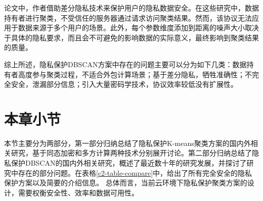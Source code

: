 论文\cite{2018DP,2015A}中，作者借助差分隐私技术来保护用户的隐私数据安全。在这些研究中，数据持有者进行聚类，不受信任的服务器通过请求访问聚类结果。然而，该协议无法应用于数据来源于多个用户的场景。此外，每个参数维度添加到距离的噪声大小取决于具体的隐私要求，而且会不可避免的影响数据的实际意义，最终影响到聚类结果的质量。

综上所述，隐私保护DBSCAN方案中存在的问题主要可以分为如下几类：数据持有者高度参与聚类过程，不适合外包计算场景；基于差分隐私，牺牲准确性；不完全安全，泄漏部分信息；引入大量密码学技术，协议效率较低没有扩展性。

\section{本章小节}
本节主要分为两部分，第一部分归纳总结了隐私保护K-means聚类方案的国内外相关研究，基于同态加密和多方计算两种技术分别展开讨论。第二部分归纳总结了隐私保护DBSCAN的国内外相关研究，概述了最近数十年的研究发展，并探讨了研究中存在的部分问题。在表格\ref{c2-table-compare}中，给出了所有完全安全的隐私保护方案以及简要的介绍信息。
总体而言，当前云环境下隐私保护聚类方案的设计，需要权衡安全性、效率和数据可用性。

\begin{table}[htbp]
	\centering	
	\renewcommand{\arraystretch}{1.3}
	\caption{完全安全的隐私保护K-means和DBSCAN方案}
	\label{c2-table-compare}
\end{table}
